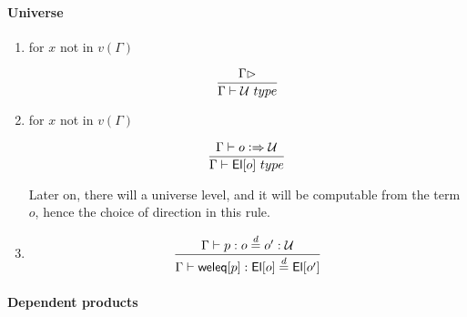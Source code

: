 \documentclass[11pt]{article}
\newcommand{\eqd}{\stackrel{d}{=}}
\newcommand{\Eu}{{\cal U}}
\newcommand{\synth}{\vcentcolon\Rightarrow}
\newcommand{\Type}{\mathop{{\, \sc type}}}
\newcommand{\ha}[2]{#1[#2]}
\newcommand{\El}{{\sf El}}
\newcommand{\weleq}{{\sf weleq}}
\begin{document}
\paragraph{Universe}

\begin{enumerate}

\item for $x$ not in $v(\Gamma)$

$$\frac{\Gamma\rhd}{\Gamma \vdash \Eu\Type}$$

\item for $x$ not in $v(\Gamma)$

$$\frac{\Gamma\vdash o \synth \Eu}{\Gamma \vdash \ha\El{o}\Type}$$

Later on, there will a universe level, and it will be computable from the
term $o$, hence the choice of direction in this rule.

\item 

$$\frac{\Gamma\vdash p : o \eqd o' : \Eu}{\Gamma\vdash \ha\weleq{p} : \ha\El{o} \eqd \ha\El{o'}}$$

\end{enumerate}

\paragraph{Dependent products}
\end{document}
